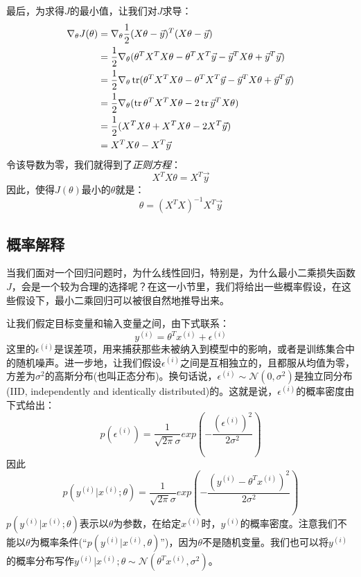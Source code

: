 最后，为求得$J$的最小值，让我们对$J$求导：
\begin{equation*}
\begin{split}
\nabla_\theta J(\theta) &= \nabla_\theta\frac{1}{2}(X\theta - \vec{y})^T(X\theta - \vec{y}) \\
&= \frac{1}{2}\nabla_\theta(\theta^TX^TX\theta - \theta^TX^T\vec{y} - \vec{y}^TX\theta + \vec{y}^T\vec{y}) \\
&= \frac{1}{2}\nabla_\theta\operatorname{tr}(\theta^TX^TX\theta - \theta^TX^T\vec{y} - \vec{y}^TX\theta + \vec{y}^T\vec{y}) \\
&= \frac{1}{2}\nabla_\theta(\operatorname{tr}\theta^TX^TX\theta - 2\operatorname{tr}\vec{y}^TX\theta) \\
&= \frac{1}{2}(X^TX\theta + X^TX\theta - 2X^T\vec{y}) \\
&= X^TX\theta - X^T\vec{y}
\end{split}
\end{equation*}
令该导数为零，我们就得到了\emph{正则方程}：
\begin{equation}
X^TX\theta = X^T\vec{y}
\end{equation}
因此，使得$J(\theta)$最小的$\theta$就是：
\begin{equation}
\theta = (X^TX)^{-1}X^T\vec{y}
\end{equation}

\subsection{概率解释}
当我们面对一个回归问题时，为什么线性回归，特别是，为什么最小二乘损失函数$J$，会是一个较为合理的选择呢？在这一小节里，我们将给出一些概率假设，在这些假设下，最小二乘回归可以被很自然地推导出来。

让我们假定目标变量和输入变量之间，由下式联系：
\begin{equation}
y^{(i)} = \theta^Tx^{(i)} + \epsilon^{(i)}
\end{equation}
这里的$\epsilon^{(i)}$是误差项，用来捕获那些未被纳入到模型中的影响，或者是训练集合中的随机噪声。进一步地，让我们假设$\epsilon^{(i)}$之间是互相独立的，且都服从均值为零，方差为$\sigma^2$的高斯分布(也叫正态分布)。换句话说，$\epsilon^{(i)} \sim \mathcal{N}(0, \sigma^2)$是独立同分布(IID, independently and identically distributed)的。这就是说，$\epsilon^{(i)}$的概率密度由下式给出：
\begin{equation*}
p(\epsilon^{(i)}) = \frac{1}{\sqrt{2\pi}\sigma}exp\left(-\frac{(\epsilon^{(i)})^2}{2\sigma^2}\right)
\end{equation*}
因此
\begin{equation}
p(y^{(i)}|x^{(i)};\theta) = \frac{1}{\sqrt{2\pi}\sigma}exp\left(-\frac{(y^{(i)} - \theta^Tx^{(i)})^2}{2\sigma^2}\right)
\end{equation}
$p(y^{(i)}|x^{(i)};\theta)$表示以$\theta$为参数，在给定$x^{(i)}$时，$y^{(i)}$的概率密度。注意我们不能以$\theta$为概率条件(``$p(y^{(i)}|x^{(i)},\theta)$'')，因为$\theta$不是随机变量。我们也可以将$y^{(i)}$的概率分布写作$y^{(i)}|x^{(i)};\theta \sim \mathcal{N}(\theta^Tx^{(i)}, \sigma^2)$。

